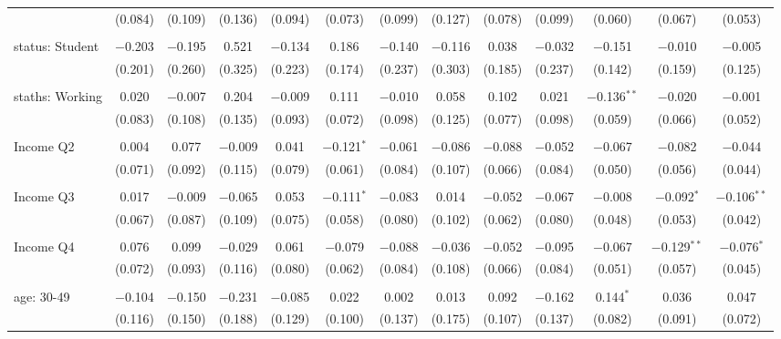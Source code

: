 \begin{tabular}{@{\extracolsep{5pt}}lcccccccccccc}
  & (0.084) & (0.109) & (0.136) & (0.094) & (0.073) & (0.099) & (0.127) & (0.078) & (0.099) & (0.060) & (0.067) & (0.053) \\ 
  & & & & & & & & & & & & \\ 
 status: Student & $-$0.203 & $-$0.195 & 0.521 & $-$0.134 & 0.186 & $-$0.140 & $-$0.116 & 0.038 & $-$0.032 & $-$0.151 & $-$0.010 & $-$0.005 \\ 
  & (0.201) & (0.260) & (0.325) & (0.223) & (0.174) & (0.237) & (0.303) & (0.185) & (0.237) & (0.142) & (0.159) & (0.125) \\ 
  & & & & & & & & & & & & \\ 
 staths: Working & 0.020 & $-$0.007 & 0.204 & $-$0.009 & 0.111 & $-$0.010 & 0.058 & 0.102 & 0.021 & $-$0.136$^{**}$ & $-$0.020 & $-$0.001 \\ 
  & (0.083) & (0.108) & (0.135) & (0.093) & (0.072) & (0.098) & (0.125) & (0.077) & (0.098) & (0.059) & (0.066) & (0.052) \\ 
  & & & & & & & & & & & & \\ 
 Income Q2 & 0.004 & 0.077 & $-$0.009 & 0.041 & $-$0.121$^{*}$ & $-$0.061 & $-$0.086 & $-$0.088 & $-$0.052 & $-$0.067 & $-$0.082 & $-$0.044 \\ 
  & (0.071) & (0.092) & (0.115) & (0.079) & (0.061) & (0.084) & (0.107) & (0.066) & (0.084) & (0.050) & (0.056) & (0.044) \\ 
  & & & & & & & & & & & & \\ 
 Income Q3 & 0.017 & $-$0.009 & $-$0.065 & 0.053 & $-$0.111$^{*}$ & $-$0.083 & 0.014 & $-$0.052 & $-$0.067 & $-$0.008 & $-$0.092$^{*}$ & $-$0.106$^{**}$ \\ 
  & (0.067) & (0.087) & (0.109) & (0.075) & (0.058) & (0.080) & (0.102) & (0.062) & (0.080) & (0.048) & (0.053) & (0.042) \\ 
  & & & & & & & & & & & & \\ 
 Income Q4 & 0.076 & 0.099 & $-$0.029 & 0.061 & $-$0.079 & $-$0.088 & $-$0.036 & $-$0.052 & $-$0.095 & $-$0.067 & $-$0.129$^{**}$ & $-$0.076$^{*}$ \\ 
  & (0.072) & (0.093) & (0.116) & (0.080) & (0.062) & (0.084) & (0.108) & (0.066) & (0.084) & (0.051) & (0.057) & (0.045) \\ 
  & & & & & & & & & & & & \\ 
 age: 30-49 & $-$0.104 & $-$0.150 & $-$0.231 & $-$0.085 & 0.022 & 0.002 & 0.013 & 0.092 & $-$0.162 & 0.144$^{*}$ & 0.036 & 0.047 \\ 
  & (0.116) & (0.150) & (0.188) & (0.129) & (0.100) & (0.137) & (0.175) & (0.107) & (0.137) & (0.082) & (0.091) & (0.072) \\ 

\end{tabular}
